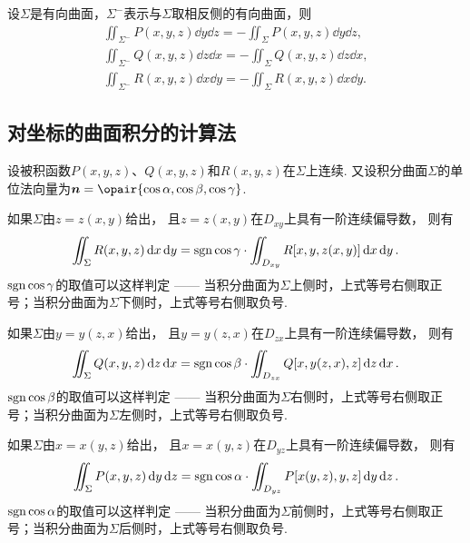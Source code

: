 \begin{property}
设\(\Sigma\)是有向曲面，\(\Sigma^-\)表示与\(\Sigma\)取相反侧的有向曲面，则\begin{gather*}
\iint_{\Sigma^-} P(x,y,z) \dd{y}\dd{z} = -\iint_{\Sigma} P(x,y,z) \dd{y}\dd{z}, \\
\iint_{\Sigma^-} Q(x,y,z) \dd{z}\dd{x} = -\iint_{\Sigma} Q(x,y,z) \dd{z}\dd{x}, \\
\iint_{\Sigma^-} R(x,y,z) \dd{x}\dd{y} = -\iint_{\Sigma} R(x,y,z) \dd{x}\dd{y}.
\end{gather*}
\end{property}

\subsection{对坐标的曲面积分的计算法}
\begin{theorem}
设被积函数\(P(x,y,z)\)、\(Q(x,y,z)\)和\(R(x,y,z)\)在\(\Sigma\)上连续.
又设积分曲面\(\Sigma\)的单位法向量为\(\mat{n} = \opair{\cos\alpha,\cos\beta,\cos\gamma}\).

如果\(\Sigma\)由\(z=z(x,y)\)给出，
且\(z=z(x,y)\)在\(D_{xy}\)上具有一阶连续偏导数，
则有\begin{equation}\label{equation:线积分与面积分.第二类曲面积分的计算式1}
\iint_{\Sigma} R(x,y,z) \dd{x}\dd{y}
= \operatorname{sgn}\cos\gamma \cdot \iint_{D_{xy}} R[x,y,z(x,y)] \dd{x}\dd{y}.
\end{equation}
\(\operatorname{sgn}\cos\gamma\)的取值可以这样判定 —— 当积分曲面为\(\Sigma\)上侧时，上式等号右侧取正号；当积分曲面为\(\Sigma\)下侧时，上式等号右侧取负号.

如果\(\Sigma\)由\(y=y(z,x)\)给出，
且\(y=y(z,x)\)在\(D_{zx}\)上具有一阶连续偏导数，
则有\begin{equation}\label{equation:线积分与面积分.第二类曲面积分的计算式2}
\iint_{\Sigma} Q(x,y,z) \dd{z}\dd{x}
= \operatorname{sgn}\cos\beta \cdot \iint_{D_{zx}} Q[x,y(z,x),z] \dd{z}\dd{x}.
\end{equation}
\(\operatorname{sgn}\cos\beta\)的取值可以这样判定 —— 当积分曲面为\(\Sigma\)右侧时，上式等号右侧取正号；当积分曲面为\(\Sigma\)左侧时，上式等号右侧取负号.

如果\(\Sigma\)由\(x=x(y,z)\)给出，
且\(x=x(y,z)\)在\(D_{yz}\)上具有一阶连续偏导数，
则有\begin{equation}\label{equation:线积分与面积分.第二类曲面积分的计算式3}
\iint_{\Sigma} P(x,y,z) \dd{y}\dd{z}
= \operatorname{sgn}\cos\alpha \cdot \iint_{D_{yz}} P[x(y,z),y,z] \dd{y}\dd{z}.
\end{equation}
\(\operatorname{sgn}\cos\alpha\)的取值可以这样判定 —— 当积分曲面为\(\Sigma\)前侧时，上式等号右侧取正号；当积分曲面为\(\Sigma\)后侧时，上式等号右侧取负号.
\end{theorem}

